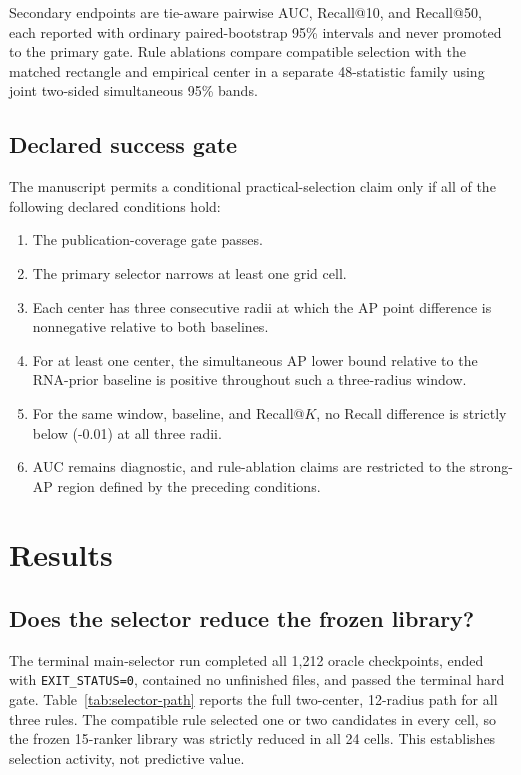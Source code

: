 \documentclass[preprint,review,12pt]{elsarticle}
\begin{document}
Secondary endpoints are tie-aware pairwise AUC, Recall@10, and Recall@50, each
reported with ordinary paired-bootstrap 95\% intervals and never promoted to
the primary gate. Rule ablations compare compatible selection with the matched
rectangle and empirical center in a separate 48-statistic family using joint
two-sided simultaneous 95\% bands.

\subsection{Declared success gate}

The manuscript permits a conditional practical-selection claim only if all of
the following declared conditions hold:

\begin{enumerate}[leftmargin=*]
  \item The publication-coverage gate passes.
  \item The primary selector narrows at least one grid cell.
  \item Each center has three consecutive radii at which the AP point
  difference is nonnegative relative to both baselines.
  \item For at least one center, the simultaneous AP lower bound relative to
  the RNA-prior baseline is positive throughout such a three-radius window.
  \item For the same window, baseline, and Recall@\(K\), no Recall difference
  is strictly below (-0.01) at all three radii.
  \item AUC remains diagnostic, and rule-ablation claims are restricted to the
  strong-AP region defined by the preceding conditions.
\end{enumerate}

\section{Results}

\subsection{Does the selector reduce the frozen library?}

The terminal main-selector run completed all 1,212 oracle checkpoints, ended
with \texttt{EXIT\_STATUS=0}, contained no unfinished files, and passed the
terminal hard gate. Table~\ref{tab:selector-path} reports the full
two-center, 12-radius path for all three rules. The compatible rule selected
one or two candidates in every cell, so the frozen 15-ranker library was
strictly reduced in all 24 cells. This establishes selection activity, not
predictive value.
\end{document}

